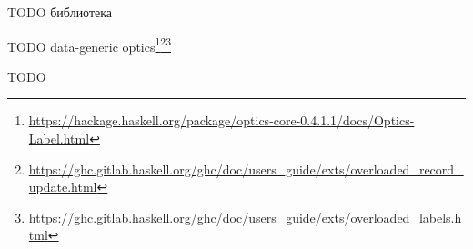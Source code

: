 TODO библиотека  %

TODO data-generic optics\footnote{\url{https://hackage.haskell.org/package/optics-core-0.4.1.1/docs/Optics-Label.html}}\footnote{\url{https://ghc.gitlab.haskell.org/ghc/doc/users_guide/exts/overloaded_record_update.html}}\footnote{\url{https://ghc.gitlab.haskell.org/ghc/doc/users_guide/exts/overloaded_labels.html}} %

TODO %












